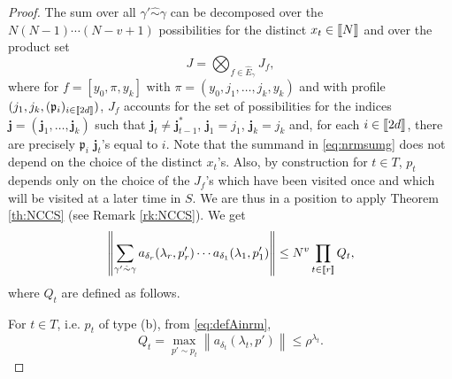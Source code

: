 \documentclass[11pt]{article}
\newcommand{\NRM}[1]{{{\left\| #1\right\|}}} %
\newcommand{\prof}{\mathfrak{p}}
\newcommand{\1}{1\!\!{\sf I}}
\newcommand{\INT}[1]{{{\left[\hspace{-1.4pt}\left[#1\right]\hspace{-1.4pt}\right]}}}
\begin{document}
\begin{proof}
The sum over all $\gamma' \hat \sim \gamma$ can be decomposed over the $N(N-1)\cdots (N-v+1)$ possibilities for the distinct $x_t \in \INT{N}$ and over  the product set 
$$
J = \bigotimes_{ f\in \widehat E_\gamma } J_f, 
$$
where for $f = [y_0,\pi,y_k]$ with $\pi = (y_0,j_1,\ldots,j_k,y_k)$ and with profile $(j_1,j_k,(\prof_i)_{i \in \INT{2d}})$, $J_f$ accounts for the set of possibilities for the indices $\bm j = (\bm j_1,\ldots,\bm j_k)$ such that $\bm j_t \ne \bm j_{t-1}^*$, $\bm j_ 1= j_1$, $\bm j_k = j_k$ and, for each $i \in \INT{2d}$, there are precisely $\prof_i$ $\bm j_t$'s equal to $i$.  Note that the summand in \eqref{eq:nrmsumg} does not depend on the choice of the distinct $x_t$'s. Also, by construction for $t \in T$, $p_t$ depends only on the choice of the $J_f$'s which have been visited once and which will be visited at a later time in $S$. We are thus in a position to apply Theorem \ref{th:NCCS} (see Remark \ref{rk:NCCS}). We get 
\begin{equation}\label{eq:bdwQt}
 \NRM{ \sum_{\gamma' \hat \sim \gamma}   a_{\delta_r}(\lambda_r,p'_r)  \cdots  a_{\delta_1}(\lambda_1,p'_1) } \leq N^v \prod_{t \in \INT{r}} Q_t,
\end{equation}
where $Q_t$ are defined as follows. 

 For $t \in T$, i.e. $p_t$ of type (b), from \eqref{eq:defAinrm},
$$
Q_t = \max_{p' \sim p_t}\NRM{ a_{\delta_t} (\lambda_t,p')} \leq \rho^{\lambda_t}.
$$


\end{proof}
\end{document}
